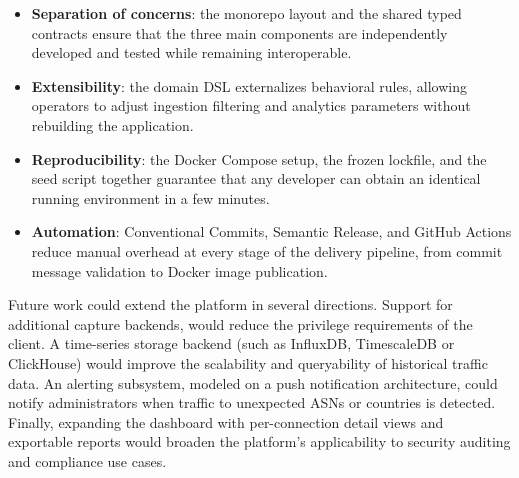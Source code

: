 \documentclass[12pt]{report}
\begin{document}
\begin{itemize}
  \item \textbf{Separation of concerns}: the monorepo layout and the shared
    typed contracts ensure that the three main components are independently
    developed and tested while remaining interoperable.
  \item \textbf{Extensibility}: the domain DSL externalizes behavioral rules,
    allowing operators to adjust ingestion filtering and analytics parameters
    without rebuilding the application.
  \item \textbf{Reproducibility}: the Docker Compose setup, the frozen lockfile,
    and the seed script together guarantee that any developer can obtain an
    identical running environment in a few minutes.
  \item \textbf{Automation}: Conventional Commits, Semantic Release, and GitHub
    Actions reduce manual overhead at every stage of the delivery pipeline, from
    commit message validation to Docker image publication.
\end{itemize}

Future work could extend the platform in several directions. Support for
additional capture backends, would reduce the
privilege requirements of the client. A time-series storage backend (such as
InfluxDB, TimescaleDB or ClickHouse) would improve the scalability and queryability of
historical traffic data. An alerting subsystem, modeled on a push notification
architecture, could notify administrators when
traffic to unexpected ASNs or countries is detected. Finally, expanding the
dashboard with per-connection detail views and exportable reports would broaden
the platform's applicability to security auditing and compliance use cases.
\end{document}
